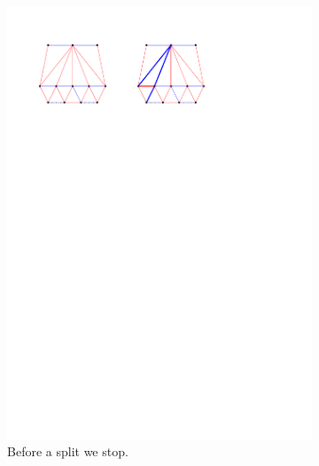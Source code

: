 \begin{figure}[!b]
\begin{subfigure}[b]{0.45 \textwidth}
        \includegraphics[width = \textwidth]{topFanFlips/img/split}
        \caption{Before a split we stop.}
        \label{fig:fanflip:split}
    \end{subfigure}
    ~
    \begin{subfigure}[b]{0.45 \textwidth}

\end{subfigure}
\end{figure}

